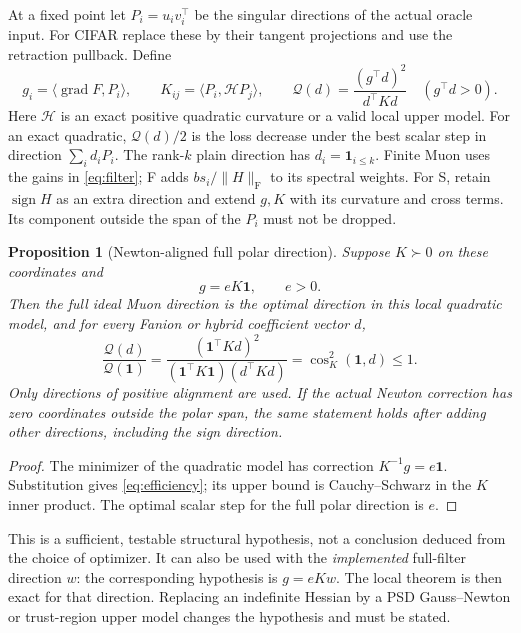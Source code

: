\documentclass[11pt]{article}
\newtheorem{proposition}[theorem]{Proposition}
\newcommand{\ip}[2]{\langle #1,#2\rangle}
\newcommand{\F}[1]{\lVert #1\rVert_{\mathrm F}}
\newcommand{\sgn}{\operatorname{sign}}
\begin{document}
At a fixed point let $P_i=u_iv_i^\top$ be the singular directions of the
actual oracle input. For CIFAR replace these by their tangent projections
and use the retraction pullback. Define
\begin{equation}\label{eq:modal-model}
 g_i=\ip{\operatorname{grad}F}{P_i},\qquad
 K_{ij}=\ip{P_i}{\mathcal H P_j},\qquad
 \mathcal Q(d)=\frac{(g^\top d)^2}{d^\top Kd}\quad(g^\top d>0).
\end{equation}
Here $\mathcal H$ is an exact positive quadratic curvature or a valid local
upper model. For an exact quadratic, $\mathcal Q(d)/2$ is the loss decrease
under the best scalar step in direction $\sum_i d_iP_i$.
The rank-$k$ plain direction has $d_i=\boldsymbol1_{i\leq k}$.
Finite Muon uses the gains in \eqref{eq:filter}; F adds $b s_i/\F{H}$
to its spectral weights. For S, retain $\sgn H$ as an extra direction and
extend $g,K$ with its curvature and cross terms. Its component outside the
span of the $P_i$ must not be dropped.

\begin{proposition}[Newton-aligned full polar direction]
Suppose $K\succ0$ on these coordinates and
\begin{equation}\label{eq:newton-alignment}
 g=eK\boldsymbol1,\qquad e>0.
\end{equation}
Then the full ideal Muon direction is the optimal direction in this local
quadratic model, and for every Fanion or hybrid coefficient vector $d$,
\begin{equation}\label{eq:efficiency}
 \frac{\mathcal Q(d)}{\mathcal Q(\boldsymbol1)}
 =\frac{(\boldsymbol1^\top Kd)^2}
 {(\boldsymbol1^\top K\boldsymbol1)(d^\top Kd)}
 =\cos_K^2(\boldsymbol1,d)\leq1.
\end{equation}
Only directions of positive alignment are used. If the actual Newton
correction has zero coordinates outside the polar span, the same statement
holds after adding other directions, including the sign direction.
\end{proposition}
\begin{proof}
The minimizer of the quadratic model has correction
$K^{-1}g=e\boldsymbol1$. Substitution gives \eqref{eq:efficiency}; its
upper bound is Cauchy--Schwarz in the $K$ inner product. The optimal scalar
step for the full polar direction is $e$.
\end{proof}

This is a sufficient, testable structural hypothesis, not a conclusion
deduced from the choice of optimizer. It can also be used with the
\emph{implemented} full-filter direction $w$: the corresponding hypothesis
is $g=eKw$. The local theorem is then exact for that direction. Replacing
an indefinite Hessian by a PSD Gauss--Newton or trust-region upper model
changes the hypothesis and must be stated.
\end{document}
